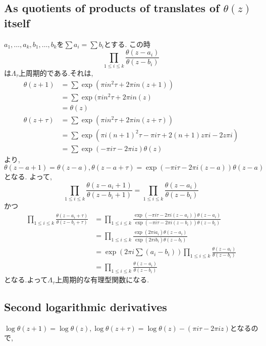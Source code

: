 \documentclass[uplatex,b5j,11pt]{jsbook}
\begin{document}
\subsection{As quotients of products of translates of $\theta(z)$ itself}

$a_1, \ldots, a_k, b_1, \ldots, b_k$を$\sum a_i = \sum b_i$とする.
この時
\begin{equation*}
 \prod_{1 \le i \le k} \frac{\theta(z -a_i)}{\theta(z - b_i)}
\end{equation*}
は$\Lambda_{\tau}$上周期的である.それは,
\begin{align*}
    \theta(z + 1) & = \sum \exp(\pi i n^2 \tau + 2 \pi i n (z+1)) \\
                  & = \sum \exp(\pi i n^2 \tau + 2 \pi i n (z) \\
                  & = \theta(z) \\
    \theta(z + \tau) & = \sum \exp(\pi i n^2 \tau + 2 \pi i n (z+\tau)) \\
                      & = \sum \exp(\pi i (n+1)^2 \tau  - \pi i \tau + 2 (n+1)z \pi i - 2 z\pi i ) \\
                      & = \sum \exp(-\pi i \tau - 2\pi i z) \theta(z)
\end{align*}
より,$\theta(z- a+1) = \theta(z-a), \theta(z - a + \tau) = \exp(- \pi i \tau - 2\pi i (z-  a)) \theta(z-a)$となる.
よって,
\begin{equation*}
 \prod_{1 \le i \le k} \frac{\theta(z -a_i + 1 )}{\theta(z - b_i + 1)}
 = \prod_{1 \le i \le k} \frac{\theta(z -a_i )}{\theta(z - b_i)}
\end{equation*}
かつ
\begin{align*}
 \prod_{1 \le i \le k} \frac{\theta(z -a_i + \tau )}{\theta(z - b_i + \tau)} &  = \prod_{1 \le i \le k} \frac{\exp(-\pi i \tau - 2\pi i (z-  a_i))\theta(z -a_i )}{\exp(-\pi i \tau - 2\pi i (z-  b_i)) \theta(z - b_i)} \\
  & = \prod_{1 \le i \le k} \frac{\exp(2 \pi i a_i) \theta(z - a_i)}{\exp(2\pi i b_i) \theta(z - b_i)} \\
  & = \exp(2\pi i \sum(a_i - b_i)) \prod_{1 \le i \le k} \frac{\theta(z - a_i)}{\theta(z - b_i)} \\
  & = \prod_{1 \le i \le k} \frac{\theta(z -a_i)}{\theta(z - b_i)}
\end{align*}
となる.よって$\Lambda_{\tau}$上周期的な有理型関数になる.

\subsection{Second logarithmic derivatives}
$\log \theta(z + 1) = \log \theta(z), \log \theta(z+ \tau) = \log \theta(z) - (\pi i \tau - 2 \pi i z)$となるので,
\end{document}
